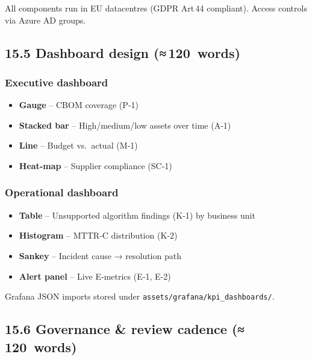 \documentclass[
  english,
]{article}
\providecommand{\tightlist}{%
  \setlength{\itemsep}{0pt}\setlength{\parskip}{0pt}}
\begin{document}
All components run in EU datacentres (GDPR Art\,44 compliant). Access
controls via Azure AD groups.

\subsection{15.5 Dashboard design
(≈\,120~words)}\label{dashboard-design-120-words}

\subsubsection{Executive dashboard}\label{executive-dashboard}

\begin{itemize}
\tightlist
\item
  \textbf{Gauge} -- CBOM coverage (P‑1)
\item
  \textbf{Stacked bar} -- High/medium/low assets over time (A‑1)
\item
  \textbf{Line} -- Budget vs.~actual (M‑1)
\item
  \textbf{Heat‑map} -- Supplier compliance (SC‑1)
\end{itemize}

\subsubsection{Operational dashboard}\label{operational-dashboard}

\begin{itemize}
\tightlist
\item
  \textbf{Table} -- Unsupported algorithm findings (K‑1) by business
  unit
\item
  \textbf{Histogram} -- MTTR‑C distribution (K‑2)
\item
  \textbf{Sankey} -- Incident cause → resolution path
\item
  \textbf{Alert panel} -- Live E‑metrics (E‑1, E‑2)
\end{itemize}

Grafana JSON imports stored under
\texttt{assets/grafana/kpi\_dashboards/}.

\subsection{15.6 Governance \& review cadence
(≈\,120~words)}\label{governance-review-cadence-120-words}
\end{document}
